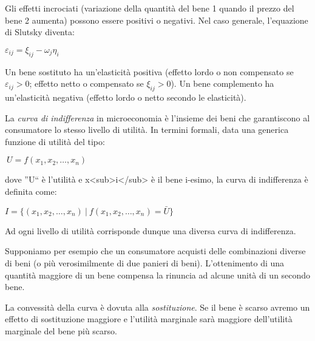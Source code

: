 Gli effetti incrociati (variazione della quantità del bene 1 quando il prezzo 
del bene 2 aumenta) possono essere positivi o negativi. Nel caso generale, 
l'equazione di Slutsky diventa:

\( \varepsilon_{ij} = \xi_{ij} - \omega_j \eta_i \)

Un bene sostituto ha un'elasticità positiva (effetto lordo o non compensato se 
\( \varepsilon_{ij} > 0 \); 
effetto netto o compensato se \( \xi_{ij} > 0 \)). 
Un bene complemento ha un'elasticità negativa (effetto lordo o netto secondo le 
elasticità).
% 
% 
% 
% 



% 

La \emph{curva di indifferenza} in microeconomia è l'insieme dei beni che 
garantiscono al consumatore lo stesso livello di utilità. 
In termini formali, data una generica funzione di utilità del tipo:

\(\ U = f(x_1,x_2,\ldots,x_n)\)

dove ''U`` è  l'utilità e x<sub>i</sub> è il bene 
i-esimo, la curva di indifferenza è definita come:

\(I = \{(x_1,x_2,\ldots,x_n)\ |\ f(x_1,x_2,\ldots,x_n)= \bar U\}\)

Ad ogni livello di utilità corrisponde dunque una diversa curva di indifferenza.

Supponiamo per esempio che un consumatore acquisti delle combinazioni diverse 
di beni (o più verosimilmente di due panieri di beni). L'ottenimento di una 
quantità maggiore di un bene compensa la rinuncia ad alcune unità di un secondo 
bene.

La convessità della curva è dovuta alla \emph{sostituzione}. 
Se il bene è scarso avremo un effetto di sostituzione maggiore e l'utilità 
marginale sarà maggiore dell'utilità marginale del bene più scarso.

